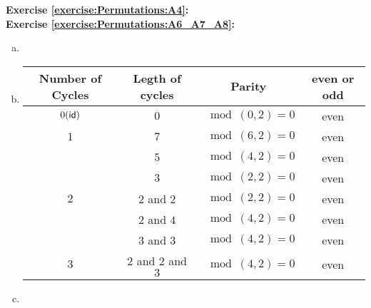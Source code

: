\noindent\textbf{Exercise  \ref{exercise:Permutations:A4}:}\\

\noindent\textbf{Exercise  \ref{exercise:Permutations:A6_A7_A8}:} %
\begin{enumerate}[(a)]
\item

\item
\begin{center}
\begin{tabular}{|c|c|c|c|}
\hline
Number of Cycles & Legth of cycles & Parity & even or odd \\
\hline
$0(\sf{id})$ & $0$ & $\mod(0,2)=0$ & even\\
\hline
$1$ & $7$ & $\mod(6,2)=0$ & even\\
& $5$ & $\mod(4,2)=0$ & even\\
& $3$ & $\mod(2,2)=0$ & even\\
\hline
$2$ & $2$ and $2$ & $\mod(2,2)=0$ & even\\  
& $2$ and $4$ & $\mod(4,2)=0$ & even\\
& $3$ and $3$ & $\mod(4,2)=0$ & even\\
\hline
$3$ & $2$ and $2$ and $3$ & $\mod(4,2)=0$ & even\\
\hline
\end{tabular}
\end{center}

\item
\end{enumerate}